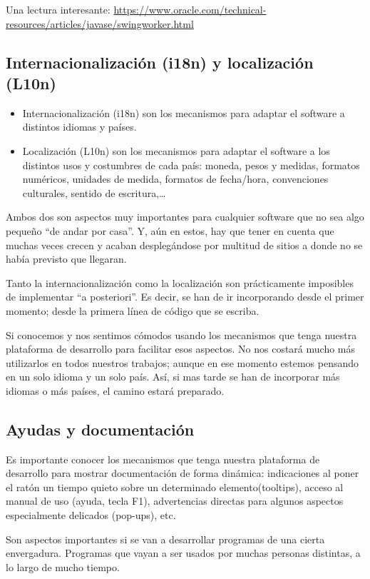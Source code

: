 \documentclass[spanish,12pt,a4paper,final,oneside]{book}
\begin{document}
Una lectura interesante: \url{https://www.oracle.com/technical-resources/articles/javase/swingworker.html}


\subsection{Internacionalización (i18n) y localización (L10n)}\label{ejercicio_localizacion}
\begin{itemize}
\item Internacionalización (i18n) son los mecanismos para adaptar el software a distintos idiomas y países.
\item Localización (L10n) son los mecanismos para adaptar el software a los distintos usos y costumbres de cada país: moneda, pesos y medidas, formatos numéricos, unidades de medida, formatos de fecha/hora, convenciones culturales, sentido de escritura,\ldots
\end{itemize}

Ambos dos son aspectos muy importantes para cualquier software que no sea algo pequeño ``de andar por casa''. Y, aún en estos, hay que tener en cuenta que muchas veces crecen y acaban desplegándose por multitud de sitios a donde no se había previsto que llegaran.

Tanto la internacionalización como la localización son prácticamente imposibles de implementar ``a posteriori''. Es decir, se han de ir incorporando desde el primer momento; desde la primera línea de código que se escriba.

Si conocemos y nos sentimos cómodos usando los mecanismos que tenga nuestra plataforma de desarrollo para facilitar esos aspectos. No nos costará mucho más utilizarlos en todos nuestros trabajos; aunque en ese momento estemos pensando en un solo idioma y un solo país. Así, si mas tarde se han de incorporar más idiomas o más países, el camino estará preparado.


\subsection{Ayudas y documentación}\label{ejercicio_ayudas}
Es importante conocer los mecanismos que tenga nuestra plataforma de desarrollo para mostrar documentación de forma dinámica: indicaciones al poner el ratón un tiempo quieto sobre un determinado elemento(tooltips), acceso al manual de uso (ayuda, tecla F1), advertencias directas para algunos aspectos especialmente delicados (pop-ups), etc.

Son aspectos importantes si se van a desarrollar programas de una cierta envergadura. Programas que vayan a ser usados por muchas personas distintas, a lo largo de mucho tiempo.
\end{document}
